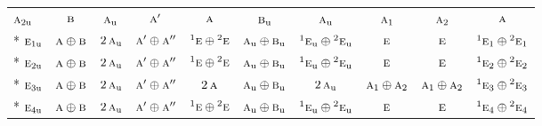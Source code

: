 \documentclass[10pt,a4paper]{article}
\numberwithin{equation}{section}
\newcommand{\irr}[1]{\text{\normalfont\scshape #1}}
\newcommand{\conjpair}[1]{{}^{#1}}
\newcommand{\ptag}[1]{\mathrm{#1}}
\begin{document}
{\begin{longtable}{@{}lccccccccc@{}}
$\irr{a}_{2\ptag{u}}$ & $\irr{b}$ & $\irr{a}_{\ptag{u}}$ & $\irr{a}'$ & $\irr{a}$ & $\irr{b}_{\ptag{u}}$ & $\irr{a}_{\ptag{u}}$ & $\irr{a}_{1}$ & $\irr{a}_{2}$ & $\irr{a}$\\*
$\irr{e}_{1\ptag{u}}$ & $\irr{a}\oplus \irr{b}$ & $2\,\irr{a}_{\ptag{u}}$ & $\irr{a}'\oplus \irr{a}''$ & $\conjpair{1}\irr{e}\oplus \conjpair{2}\irr{e}$ & $\irr{a}_{\ptag{u}}\oplus \irr{b}_{\ptag{u}}$ & $\conjpair{1}\irr{e}_{\ptag{u}}\oplus \conjpair{2}\irr{e}_{\ptag{u}}$ & $\irr{e}$ & $\irr{e}$ & $\conjpair{1}\irr{e}_{1}\oplus \conjpair{2}\irr{e}_{1}$\\*
$\irr{e}_{2\ptag{u}}$ & $\irr{a}\oplus \irr{b}$ & $2\,\irr{a}_{\ptag{u}}$ & $\irr{a}'\oplus \irr{a}''$ & $\conjpair{1}\irr{e}\oplus \conjpair{2}\irr{e}$ & $\irr{a}_{\ptag{u}}\oplus \irr{b}_{\ptag{u}}$ & $\conjpair{1}\irr{e}_{\ptag{u}}\oplus \conjpair{2}\irr{e}_{\ptag{u}}$ & $\irr{e}$ & $\irr{e}$ & $\conjpair{1}\irr{e}_{2}\oplus \conjpair{2}\irr{e}_{2}$\\*
$\irr{e}_{3\ptag{u}}$ & $\irr{a}\oplus \irr{b}$ & $2\,\irr{a}_{\ptag{u}}$ & $\irr{a}'\oplus \irr{a}''$ & $2\,\irr{a}$ & $\irr{a}_{\ptag{u}}\oplus \irr{b}_{\ptag{u}}$ & $2\,\irr{a}_{\ptag{u}}$ & $\irr{a}_{1}\oplus \irr{a}_{2}$ & $\irr{a}_{1}\oplus \irr{a}_{2}$ & $\conjpair{1}\irr{e}_{3}\oplus \conjpair{2}\irr{e}_{3}$\\*
$\irr{e}_{4\ptag{u}}$ & $\irr{a}\oplus \irr{b}$ & $2\,\irr{a}_{\ptag{u}}$ & $\irr{a}'\oplus \irr{a}''$ & $\conjpair{1}\irr{e}\oplus \conjpair{2}\irr{e}$ & $\irr{a}_{\ptag{u}}\oplus \irr{b}_{\ptag{u}}$ & $\conjpair{1}\irr{e}_{\ptag{u}}\oplus \conjpair{2}\irr{e}_{\ptag{u}}$ & $\irr{e}$ & $\irr{e}$ & $\conjpair{1}\irr{e}_{4}\oplus \conjpair{2}\irr{e}_{4}$\\
\bottomrule\end{longtable}}
\end{document}
